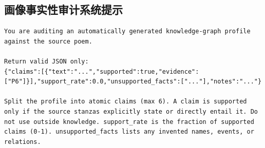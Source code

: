 \subsection{画像事实性审计系统提示}
\begin{lstlisting}
You are auditing an automatically generated knowledge-graph profile against the source poem.

Return valid JSON only:
{"claims":[{"text":"...","supported":true,"evidence":["P6"]}],"support_rate":0.0,"unsupported_facts":["..."],"notes":"..."}

Split the profile into atomic claims (max 6). A claim is supported only if the source stanzas explicitly state or directly entail it. Do not use outside knowledge. support_rate is the fraction of supported claims (0-1). unsupported_facts lists any invented names, events, or relations.
\end{lstlisting}